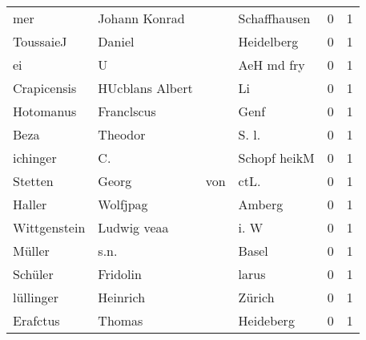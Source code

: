 \begin{center}
\begin{tiny}
\begin{longtabu}{llllrr}
                      mer &                      Johann Konrad &             &                                Schaffhausen &          0 &         1 \\
                ToussaieJ &                             Daniel &             &                                  Heidelberg &          0 &         1 \\
                       ei &                                  U &             &                                  AeH md fry &          0 &         1 \\
              Crapicensis &                    HUcblans Albert &             &                                          Li &          0 &         1 \\
                Hotomanus &                         Franclscus &             &                                        Genf &          0 &         1 \\
                     Beza &                            Theodor &             &                                      S. l.  &          0 &         1 \\
                 ichinger &                                 C. &             &                                Schopf heikM &          0 &         1 \\
                  Stetten &                              Georg &         von &                                       ctL.  &          0 &         1 \\
                   Haller &                           Wolfjpag &             &                                      Amberg &          0 &         1 \\
             Wittgenstein &                        Ludwig veaa &             &                                        i. W &          0 &         1 \\
                   Müller &                               s.n. &             &                                       Basel &          0 &         1 \\
                  Schüler &                           Fridolin &             &                                       larus &          0 &         1 \\
                lüllinger &                           Heinrich &             &                                      Zürich &          0 &         1 \\
                 Erafctus &                             Thomas &             &                                   Heideberg &          0 &         1 \\

\end{longtabu}
\end{tiny}
\end{center}

